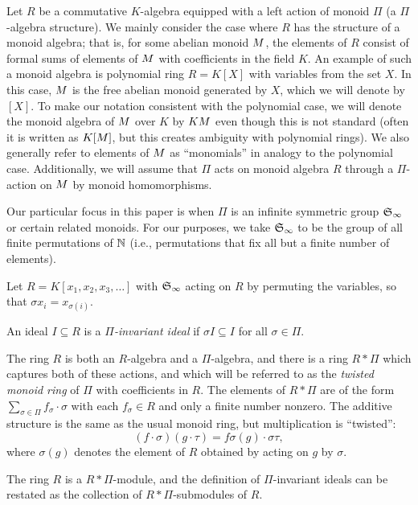 Let $R$ be a commutative $K$-algebra equipped with a left action of monoid $\Pi$ (a $\Pi$-algebra structure).  We mainly consider the case where $R$ has the structure of a monoid algebra; that is, for some abelian monoid $M$, the elements of $R$ consist of formal sums of elements of $M$ with coefficients in the field $K$.  An example of such a monoid algebra is polynomial ring $R = K[X]$ with variables from the set $X$.  In this case, $M$ is the free abelian monoid generated by $X$, which we will denote by $[X]$.  To make our notation consistent with the polynomial case, we will denote the monoid algebra of $M$ over $K$ by $KM$ even though this is not standard (often it is written as $K[M]$, but this creates ambiguity with polynomial rings).  We also generally refer to elements of $M$ as ``monomials'' in analogy to the polynomial case.  Additionally, we will assume that $\Pi$ acts on monoid algebra $R$ through a $\Pi$-action on $M$ by monoid homomorphisms.

Our particular focus in this paper is when $\Pi$ is an infinite symmetric group $\mathfrak S_\infty$ or certain related monoids.  For our purposes, we take $\mathfrak S_\infty$ to be the group of all finite permutations of $\mathbb N$ (i.e., permutations that fix all but a finite number of elements).

\begin{example}
 Let $R = K[x_1,x_2,x_3,\ldots]$ with $\mathfrak S_\infty$ acting on $R$ by permuting the variables, so that $\sigma x_i = x_{\sigma(i)}$.
\end{example}

\begin{definition}
 An ideal $I \subseteq R$ is a {\em $\Pi$-invariant ideal} if $\sigma I \subseteq I$ for all $\sigma \in \Pi$.
\end{definition}

The ring $R$ is both an $R$-algebra and a $\Pi$-algebra, and there is a ring $R*\Pi$ which captures both of these actions, and which will be referred to as the {\em twisted monoid ring} of $\Pi$ with coefficients in $R$.  The elements of $R*\Pi$ are of the form $\sum_{\sigma \in \Pi} f_{\sigma}\cdot \sigma$ with each $f_\sigma \in R$ and only a finite number nonzero.  The additive structure is the same as the usual monoid ring, but multiplication is ``twisted'':
 \[ (f\cdot \sigma)(g \cdot \tau) = f\sigma(g) \cdot \sigma\tau,\]
where $\sigma(g)$ denotes the element of $R$ obtained by acting on $g$ by $\sigma$.

The ring $R$ is a $R*\Pi$-module, and the definition of $\Pi$-invariant ideals can be restated as the collection of $R*\Pi$-submodules of $R$.

